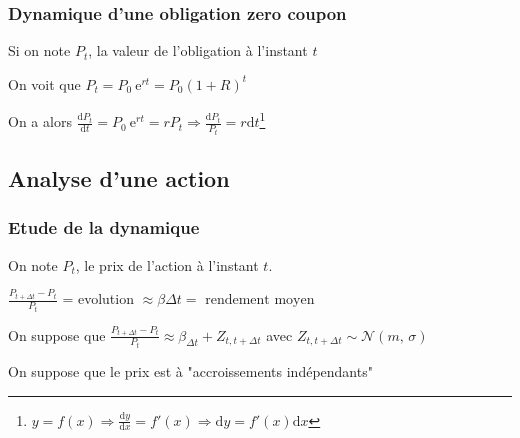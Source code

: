 \documentclass{report}
\begin{document}
\subsubsection{Dynamique d'une obligation zero coupon}

Si on note $P_t$, la valeur de l'obligation à l'instant $t$

On voit que $P_t = P_0\ \mbox{e}^{rt}=P_0(1+R)^t$

On a alors $\displaystyle\frac{\mathrm{d}P_t}{\mathrm{d}t} =   P_0\ \mbox{e}^{rt} = rP_t \Rightarrow \displaystyle\frac{\mathrm{d}P_t}{P_t} = r\mathrm{d}t$\footnote{$y = f(x) \Rightarrow \displaystyle \frac{\mathrm{d}y}{\mathrm{d}x} = f'(x) \Rightarrow \mathrm{d}y = f'(x)\mathrm{d}x$}



\subsection{Analyse d'une action}
\subsubsection{Etude de la dynamique}
On note $P_t$, le prix de l'action à l'instant $t$.
\begin{center}
    $\displaystyle\frac{P_{t+\Delta t} - P_t}{P_t}$ = evolution $\approx \beta \Delta t = \mbox{ rendement moyen}$
\end{center}

On suppose que $\displaystyle\frac{P_{t+\Delta t} - P_t}{P_t} \approx \beta_{\Delta t} + Z_{t,t+\Delta t}$ avec $Z_{t,t+\Delta t} \sim \mathcal{N}(m,\,\sigma)$

On suppose que le prix est à "accroissements indépendants"
\end{document}
